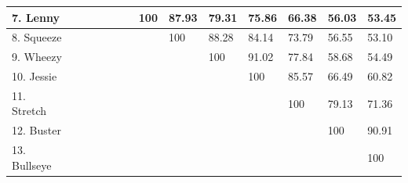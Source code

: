 \documentclass[a4paper, 12pt]{book}
\begin{document}
\begin{table}[htbp]
{\begin{tabular}{|l|l|l|l|l|l|l|l|l|l|l|l|l|l|}
		7. Lenny     & \cellcolor[HTML]{000000} & \cellcolor[HTML]{000000} & \cellcolor[HTML]{000000} & \cellcolor[HTML]{000000} & \cellcolor[HTML]{000000} & \cellcolor[HTML]{000000} & 100                      & 87.93                    & 79.31                    & 75.86                    & 66.38                    & 56.03                    & 53.45        \\ \hline
		8. Squeeze   & \cellcolor[HTML]{000000} & \cellcolor[HTML]{000000} & \cellcolor[HTML]{000000} & \cellcolor[HTML]{000000} & \cellcolor[HTML]{000000} & \cellcolor[HTML]{000000} & \cellcolor[HTML]{000000} & 100                      & 88.28                    & 84.14                    & 73.79                    & 56.55                    & 53.10        \\ \hline
		9. Wheezy    & \cellcolor[HTML]{000000} & \cellcolor[HTML]{000000} & \cellcolor[HTML]{000000} & \cellcolor[HTML]{000000} & \cellcolor[HTML]{000000} & \cellcolor[HTML]{000000} & \cellcolor[HTML]{000000} & \cellcolor[HTML]{000000} & 100                      & 91.02                    & 77.84                    & 58.68                    & 54.49        \\ \hline
		10. Jessie   & \cellcolor[HTML]{000000} & \cellcolor[HTML]{000000} & \cellcolor[HTML]{000000} & \cellcolor[HTML]{000000} & \cellcolor[HTML]{000000} & \cellcolor[HTML]{000000} & \cellcolor[HTML]{000000} & \cellcolor[HTML]{000000} & \cellcolor[HTML]{000000} & 100                      & 85.57                    & 66.49                    & 60.82        \\ \hline
		11. Stretch  & \cellcolor[HTML]{000000} & \cellcolor[HTML]{000000} & \cellcolor[HTML]{000000} & \cellcolor[HTML]{000000} & \cellcolor[HTML]{000000} & \cellcolor[HTML]{000000} & \cellcolor[HTML]{000000} & \cellcolor[HTML]{000000} & \cellcolor[HTML]{000000} & \cellcolor[HTML]{000000} & 100                      & 79.13                    & 71.36        \\ \hline
		12. Buster   & \cellcolor[HTML]{000000} & \cellcolor[HTML]{000000} & \cellcolor[HTML]{000000} & \cellcolor[HTML]{000000} & \cellcolor[HTML]{000000} & \cellcolor[HTML]{000000} & \cellcolor[HTML]{000000} & \cellcolor[HTML]{000000} & \cellcolor[HTML]{000000} & \cellcolor[HTML]{000000} & \cellcolor[HTML]{000000} & 100                      & 90.91        \\ \hline
		13. Bullseye & \cellcolor[HTML]{000000} & \cellcolor[HTML]{000000} & \cellcolor[HTML]{000000} & \cellcolor[HTML]{000000} & \cellcolor[HTML]{000000} & \cellcolor[HTML]{000000} & \cellcolor[HTML]{000000} & \cellcolor[HTML]{000000} & \cellcolor[HTML]{000000} & \cellcolor[HTML]{000000} & \cellcolor[HTML]{000000} & \cellcolor[HTML]{000000} & 100          \\ \hline
	\end{tabular}}
\end{table}
\end{document}
